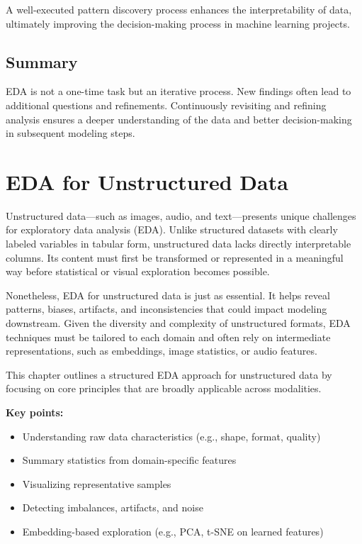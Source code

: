\documentclass[12pt,openany]{book}
\begin{document}
A well-executed pattern discovery process enhances the interpretability of data, ultimately improving the decision-making process in machine learning projects.


\section{Summary}
EDA is not a one-time task but an iterative process. New findings often lead to additional questions and refinements. Continuously revisiting and refining analysis ensures a deeper understanding of the data and better decision-making in subsequent modeling steps.



\chapter{EDA for Unstructured Data}

Unstructured data—such as images, audio, and text—presents unique 
challenges for exploratory data analysis (EDA). Unlike structured datasets 
with clearly labeled variables in tabular form, unstructured data lacks 
directly interpretable columns. Its content must first be transformed 
or represented in a meaningful way before statistical or visual 
exploration becomes possible. \newline

Nonetheless, EDA for unstructured data is just as essential. It helps 
reveal patterns, biases, artifacts, and inconsistencies that could 
impact modeling downstream. Given the diversity and complexity of 
unstructured formats, EDA techniques must be tailored to each domain 
and often rely on intermediate representations, such as embeddings, 
image statistics, or audio features. \newline

This chapter outlines a structured EDA approach for unstructured data 
by focusing on core principles that are broadly applicable across 
modalities.
\newline

\textbf{Key points:}
\begin{itemize}
    \item Understanding raw data characteristics (e.g., shape, format, quality)
    \item Summary statistics from domain-specific features 
    \item Visualizing representative samples
    \item Detecting imbalances, artifacts, and noise
    \item Embedding-based exploration (e.g., PCA, t-SNE on learned features)
\end{itemize}
\end{document}
